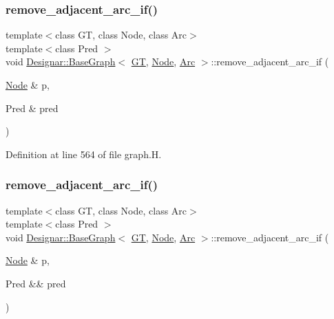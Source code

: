 \subsubsection{\texorpdfstring{remove\+\_\+adjacent\+\_\+arc\+\_\+if()}{remove\_adjacent\_arc\_if()}\hspace{0.1cm}{\footnotesize\ttfamily [1/2]}}
{\footnotesize\ttfamily template$<$class GT, class Node, class Arc$>$ \\
template$<$class Pred $>$ \\
void \hyperlink{class_designar_1_1_base_graph}{Designar\+::\+Base\+Graph}$<$ \hyperlink{demo-buildgraph_8_c_a3001c40d2c31ca87ed96cd7d1334a55e}{GT}, \hyperlink{namespace_designar_a5af326c65aa2bd26b26c410f2030d09e}{Node}, \hyperlink{namespace_designar_a3f55fb5513d62ff47cbc8f72b8e95d6f}{Arc} $>$\+::remove\+\_\+adjacent\+\_\+arc\+\_\+if (\begin{DoxyParamCaption}\item[{\hyperlink{namespace_designar_a5af326c65aa2bd26b26c410f2030d09e}{Node} \&}]{p,  }\item[{Pred \&}]{pred }\end{DoxyParamCaption})\hspace{0.3cm}{\ttfamily [inline]}}



Definition at line 564 of file graph.\+H.

\mbox{\label{class_designar_1_1_base_graph_a10423075ea81c629e88974fa882ec903}} 
\subsubsection{\texorpdfstring{remove\+\_\+adjacent\+\_\+arc\+\_\+if()}{remove\_adjacent\_arc\_if()}\hspace{0.1cm}{\footnotesize\ttfamily [2/2]}}
{\footnotesize\ttfamily template$<$class GT, class Node, class Arc$>$ \\
template$<$class Pred $>$ \\
void \hyperlink{class_designar_1_1_base_graph}{Designar\+::\+Base\+Graph}$<$ \hyperlink{demo-buildgraph_8_c_a3001c40d2c31ca87ed96cd7d1334a55e}{GT}, \hyperlink{namespace_designar_a5af326c65aa2bd26b26c410f2030d09e}{Node}, \hyperlink{namespace_designar_a3f55fb5513d62ff47cbc8f72b8e95d6f}{Arc} $>$\+::remove\+\_\+adjacent\+\_\+arc\+\_\+if (\begin{DoxyParamCaption}\item[{\hyperlink{namespace_designar_a5af326c65aa2bd26b26c410f2030d09e}{Node} \&}]{p,  }\item[{Pred \&\&}]{pred }\end{DoxyParamCaption})\hspace{0.3cm}{\ttfamily [inline]}}



